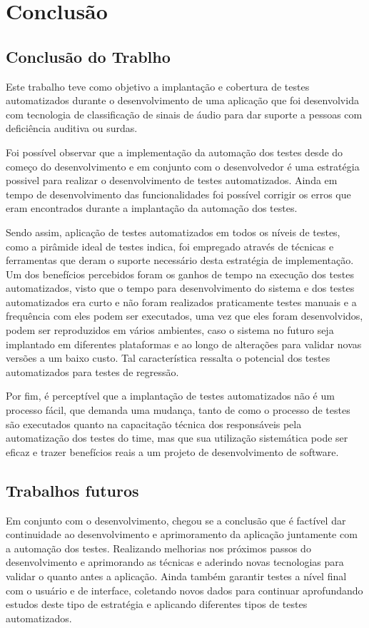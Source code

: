 \chapter{Conclusão}



\section{Conclusão do Trablho}

Este trabalho teve como objetivo a implantação e cobertura de testes automatizados durante o desenvolvimento de uma aplicação que foi desenvolvida com tecnologia de classificação de sinais de áudio para dar suporte a pessoas com deficiência auditiva ou surdas.

Foi possível observar que a implementação da automação dos testes desde do começo do desenvolvimento e em conjunto com o desenvolvedor
é uma estratégia possivel para realizar o desenvolvimento de testes automatizados. Ainda em tempo de desenvolvimento das funcionalidades foi possível corrigir os erros que eram encontrados durante a implantação da automação dos testes.

Sendo assim, aplicação de testes automatizados em todos os níveis de testes, como a pirâmide ideal de testes indica, foi empregado através de técnicas e ferramentas que deram o suporte necessário desta estratégia de implementação. Um dos benefícios percebidos foram os ganhos de tempo na execução dos testes automatizados, visto que o tempo para desenvolvimento do sistema e dos testes automatizados era curto e não foram realizados praticamente testes manuais e a frequência com eles podem ser executados, uma vez que eles foram desenvolvidos, podem ser reproduzidos em vários ambientes, caso o sistema no futuro seja implantado em diferentes plataformas e ao longo de alterações para validar novas versões a um baixo custo. Tal característica ressalta o potencial dos testes automatizados para testes de regressão.

Por fim,  é perceptível que a implantação de testes automatizados não é um processo fácil, que demanda uma mudança, tanto de como o processo de testes são executados quanto na capacitação  técnica dos responsáveis pela automatização dos testes do time, mas que sua utilização sistemática pode ser eficaz e trazer benefícios reais a um projeto de desenvolvimento de software. 


\section{Trabalhos futuros}

Em conjunto com o desenvolvimento, chegou se a conclusão que é factível dar continuidade ao desenvolvimento e aprimoramento da aplicação juntamente com a automação dos testes. Realizando melhorias nos próximos passos do desenvolvimento e aprimorando as técnicas e aderindo novas tecnologias para validar o quanto antes a aplicação. Ainda também garantir testes a nível final com o usuário e de interface, coletando novos dados para continuar aprofundando estudos deste tipo de estratégia e aplicando diferentes tipos de testes automatizados.
